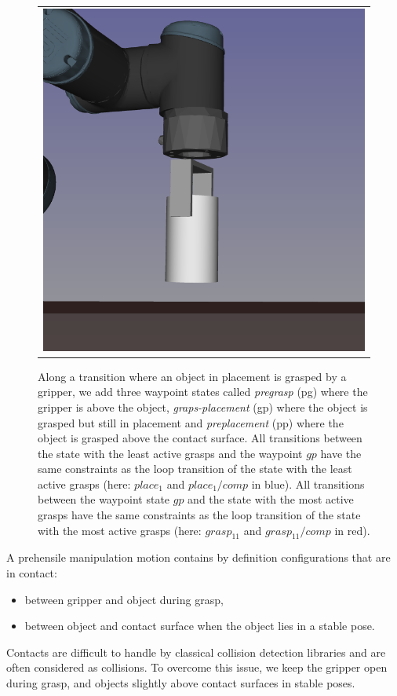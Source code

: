 \begin{figure}
{{\begin {tabular}{c}
      \includegraphics [width=.9\linewidth] {figures/placement-preplace-ur3.png}\\
      \end{tabular}
    }
  }
  \caption{Along a transition where an object in placement is grasped
    by a gripper, we add three waypoint states called
    \textit{pregrasp} (pg) where the gripper is above the object,
    \textit{graps-placement} (gp) where the object is grasped but
    still in placement and \textit{preplacement} (pp) where the object
    is grasped above the contact surface. All transitions between the
    state with the least active grasps and the waypoint $gp$ have the
    same constraints as the loop transition of the state with the
    least active grasps (here: $place_1$ and $place_1/comp$ in
    blue). All transitions between the waypoint state $gp$ and the
    state with the most active grasps have the same constraints as the
    loop transition of the state with the most active grasps (here: $grasp_{11}$
    and $grasp_{11}/comp$ in red).}
  \label{fig:pregrasp-placement}
\end{figure}

A prehensile manipulation motion contains by definition configurations that are in contact:
\begin{itemize}
\item between gripper and object during grasp,
\item between object and contact surface when the object lies in a stable pose.
\end{itemize}
Contacts are difficult to handle by classical collision detection libraries and are often considered as collisions. To overcome this issue, we keep the gripper open during grasp, and objects slightly above contact surfaces in stable poses.

